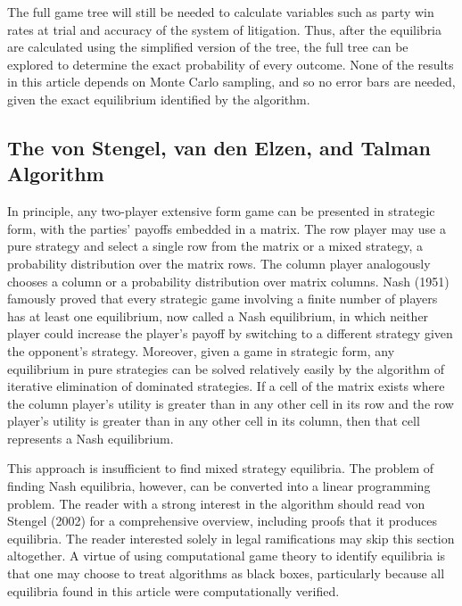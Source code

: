 \documentclass{article}
\begin{document}
The full game tree will still be needed to calculate variables such as party win rates at trial and accuracy of the system of litigation. Thus, after the equilibria are calculated using the simplified version of the tree, the full tree can be explored to determine the exact probability of every outcome. None of the results in this article depends on Monte Carlo sampling, and so no error bars are needed, given the exact equilibrium identified by the algorithm.

\subsection{The von Stengel, van den Elzen, and Talman Algorithm}

In principle, any two-player extensive form game can be presented in strategic form, with the parties' payoffs embedded in a matrix. The row player may use a pure strategy and select a single row from the matrix or a mixed strategy, a probability distribution over the matrix rows. The column player analogously chooses a column or a probability distribution over matrix columns. Nash (1951) famously proved that every strategic game involving a finite number of players has at least one equilibrium, now called a Nash equilibrium, in which neither player could increase the player's payoff by switching to a different strategy given the opponent's strategy. Moreover, given a game in strategic form, any equilibrium in pure strategies can be solved relatively easily by the algorithm of iterative elimination of dominated strategies. If a cell of the matrix exists where the column player's utility is greater than in any other cell in its row and the row player's utility is greater than in any other cell in its column, then that cell represents a Nash equilibrium. 

This approach is insufficient to find mixed strategy equilibria. The problem of finding Nash equilibria, however, can be converted into a linear programming problem. The reader with a strong interest in the algorithm should read von Stengel (2002) for a comprehensive overview, including proofs that it produces equilibria. The reader interested solely in legal ramifications may skip this section altogether. A virtue of using computational game theory to identify equilibria is that one may choose to treat algorithms as black boxes, particularly because all equilibria found in this article were computationally verified.
\end{document}
